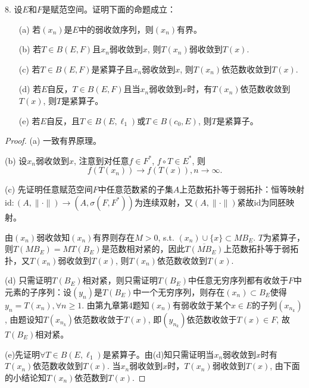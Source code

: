 \documentclass[a4paper,8pt]{ctexart}\textwidth 140mm \textheight 216mm
\newcommand{\8}{\infty}
\begin{document}
8. 设$E$和$F$是赋范空间。证明下面的命题成立：
\begin{itemize}
	\item[(a)] 若$(x_n)$是$E$中的弱收敛序列，则$(x_n)$有界。
	\item[(b)] 若$T\in B(E,F)$且$x_n$弱收敛到$x$, 则$T(x_n)$弱收敛到$T(x)$.
	\item[(c)] 若$T\in B(E,F)$是紧算子且$x_n$弱收敛到$x$, 则$T(x_n)$依范数收敛到$T(x)$.
	\item[(d)] 若$E$自反，$T\in B(E,F)$且当$x_n$弱收敛到$x$时，有$T(x_n)$依范数收敛到$T(x)$, 则$T$是紧算子。
	\item[(e)] 若$E$自反，且$T\in B(E,\ell_1)$或$T\in B(c_0,E)$, 则$T$是紧算子。
\end{itemize}
\begin{proof}
	(a) 一致有界原理。
	
	(b) 设$x_n$弱收敛到$x$, 注意到对任意$f\in F^*$, $f\circ T\in E^*$, 则
	\[f(T(x_n))\to f(T(x)), n\to\infty.\]
	
	(c) 先证明任意赋范空间$F$中任意范数紧的子集$A$上范数拓扑等于弱拓扑：恒等映射$\mathrm{id}: (A,\|\cdot\|)\to (A,\sigma(F,F^*))$为连续双射，又$(A,\|\cdot\|)$紧故$\mathrm{id}$为同胚映射。
	
	由$(x_n)$弱收敛知$(x_n)$有界则存在$M>0$, s.t. $(x_n)\cup \{x\}\subset M B_E$. $T$为紧算子，则$T(MB_E)=MT(B_E)$是范数相对紧的，因此$\overline{T(MB_E)}$上范数拓扑等于弱拓扑，又$T(x_n)$弱收敛到$T(x)$, 则$T(x_n)$依范数收敛到$T(x)$.
	
	(d) 只需证明$T(B_E)$相对紧，则只需证明$T(B_E)$中任意无穷序列都有收敛于$F$中元素的子序列：设$(y_n)$是$T(B_E)$中一个无穷序列，则存在$(x_n)\subset B_E$使得$y_n=T(x_n), \forall n\geq 1$. 由第九章第4题知$(x_n)$有弱收敛于某个$x\in  E$的子列$(x_{n_k})$, 由题设知$T(x_{n_k})$依范数收敛于$T(x)$, 即$(y_{n_k})$依范数收敛于$T(x)\in F$, 故$T(B_E)$相对紧。
	
	(e)先证明$\forall T\in B(E,\ell_1)$是紧算子。由(d)知只需证明当$x_n$弱收敛到$x$时有$T(x_n)$依范数收敛到$T(x)$. 当$x_n$弱收敛到$x$时，$T(x_n)$弱收敛到$T(x)$, 由下面的小结论知$T(x_n)$依范数到$T(x)$.
	

\end{proof}
\end{document}

